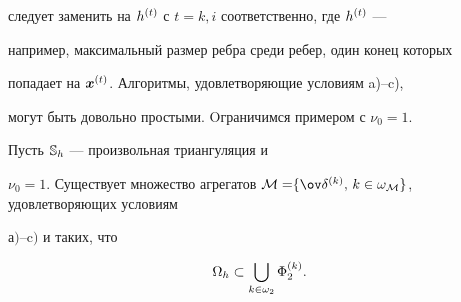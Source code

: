 следует заменить на $h^{(t)}$ с $t=k,i$ соответственно, где $h^{(t)}$ ---


например, максимальный размер ребра среди ребер, один конец которых


попадает на $\boldsymbol x^{(t)}$. Алгоритмы, удовлетворяющие условиям a)--c),


могут быть довольно простыми. Oграничимся примером с $\nu_0=1$.





\begin{lems}


Пусть $\Bbb S_h$ --- произвольная триангуляция и


$\nu_0=1$. Существует множество агрегатов ${\cal M=}\{\ov\delta\up k,\,


k\in\omega_{\cal M}\}$, удовлетворяющих условиям


$\mathrm а)$--$\mathrm c)$ и таких, что


\begin{equation}\label{3.9}


\Omega_h\subset\bigcup_{k\in\omega_2}\Phi_2\up k.


\end{equation}


\end{lems}





